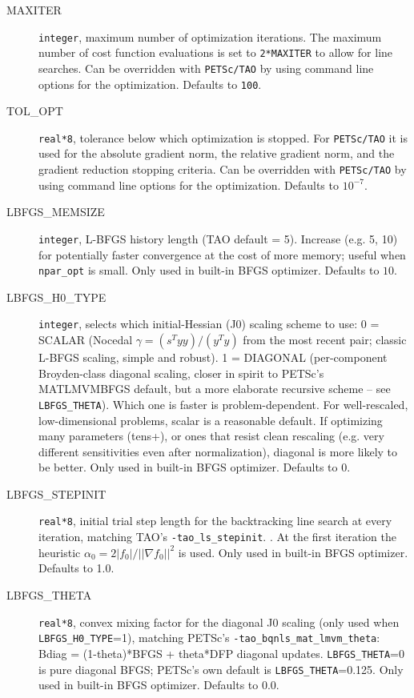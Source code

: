\begin{description}
  \item[MAXITER] {\tt integer}, maximum number of optimization iterations. The maximum number of cost function evaluations is set to {\tt 2*MAXITER} to allow for line searches. Can be overridden with {\tt PETSc/TAO} by using command line options for the optimization. Defaults to {\tt 100}.
  \item[TOL\_OPT] {\tt real*8}, tolerance below which optimization is stopped. For {\tt PETSc/TAO} it is used for the absolute gradient norm, the relative gradient norm, and the gradient reduction stopping criteria. Can be overridden with {\tt PETSc/TAO} by using command line options for the optimization. Defaults to $10^{-7}$.
  \item[LBFGS\_MEMSIZE] {\tt integer}, L-BFGS history length (TAO default = 5). Increase (e.g. 5, 10) for potentially faster convergence at the cost of more memory; useful when {\tt npar\_opt} is small. Only used in built-in BFGS optimizer. Defaults to $10$.
  \item[LBFGS\_H0\_TYPE] {\tt integer}, selects which initial-Hessian (J0) scaling scheme to use: 0 = SCALAR  (Nocedal $\gamma =(s^T y y)/(y^T y)$ from the most recent pair; classic L-BFGS scaling, simple and robust). 1 = DIAGONAL (per-component Broyden-class diagonal scaling, closer in spirit to PETSc's MATLMVMBFGS default, but a more elaborate recursive scheme -- see {\tt LBFGS\_THETA}). Which one is faster is problem-dependent. For well-rescaled, low-dimensional problems, scalar is a reasonable default. If optimizing many parameters (tens+), or ones that resist clean rescaling (e.g. very different sensitivities even after normalization), diagonal is more likely to be better. Only used in built-in BFGS optimizer. Defaults to 0.
  \item[LBFGS\_STEPINIT] {\tt real*8},  initial trial step length for the backtracking line search at every iteration, matching TAO's {\tt-tao\_ls\_stepinit}. . At the first iteration the heuristic $\alpha_0 = 2\vert f_0\vert / \vert\vert \nabla f_0 \vert\vert^2$ is used. Only used in built-in BFGS optimizer. Defaults to 1.0.
  \item[LBFGS\_THETA] {\tt real*8},  convex mixing factor for the diagonal J0 scaling (only used when {\tt LBFGS\_H0\_TYPE}=1), matching PETSc's {\tt -tao\_bqnls\_mat\_lmvm\_theta}: Bdiag = (1-theta)*BFGS + theta*DFP diagonal updates. {\tt LBFGS\_THETA}=0 is pure diagonal BFGS; PETSc's own default is {\tt LBFGS\_THETA}=0.125. Only used in built-in BFGS optimizer. Defaults to 0.0.

\end{description}
